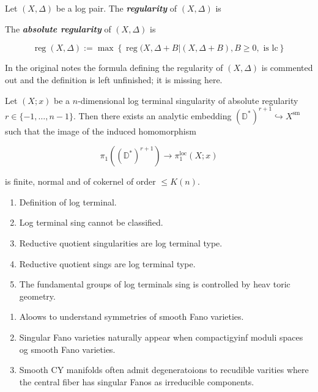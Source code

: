 \begin{definition}
\label{definition-moraga-10}
Let $(X,\Delta)$ be a log pair. The
\textit{\textbf{regularity}} of $(X,\Delta)$
is

The \textit{\textbf{absolute regularity}} of
$(X,\Delta)$ is

$$
\hat{\operatorname{reg}}(X,\Delta):=
\operatorname{max}\left\{
\operatorname{reg}(X,\Delta +B|(X,\Delta +B),
B\geq 0, \text{ is lc}  \right\}
$$

\end{definition}

\medskip{} In the
original notes the formula defining the
regularity of $(X,\Delta)$ is commented out
and the definition is left unfinished; it is
missing here.

\begin{theorem}[M (speaker),21]
\label{theorem-moraga-16}
Let $(X;x)$ be a $n$-dimensional log terminal
singularity of absolute regularity $r\in
\{-1,\ldots,n-1\} $. Then there exists an
analytic embedding $(\mathbb{D}^{*} )^{r+1}
\hookrightarrow X^{\operatorname{sm}}$ such
that the image of the induced homomorphism

$$
\pi_{1}(\left(\mathbb{D}^{*}
\right)^{r+1})\to
\pi_{1}^{\operatorname{loc}}(X;x)
$$

is finite, normal and of cokernel of order
$\leq K(n)$.
\end{theorem}

\medskip{}

\begin{enumerate}
\item Definition of log terminal.
\item Log terminal sing cannot be classified.
\item Reductive quotient singularities are
log terminal type.
\item Reductive quotient sings are log
terminal type.
\item  The fundamental groups of log
terminals sing is controlled by {heav} toric
geometry.
\end{enumerate}

\medskip{}

\medskip{}

\medskip{}

\begin{enumerate}
\item Aloows to understand symmetries of
smooth Fano varieties.
\item Singular Fano varieties naturally
appear when compactigyinf moduli spaces og
smooth Fano varieties.
\item Smooth CY manifolds often admit
degeneratoions to recudible varities where
the central fiber has singular Fanos as
irreducible components.
\end{enumerate}

